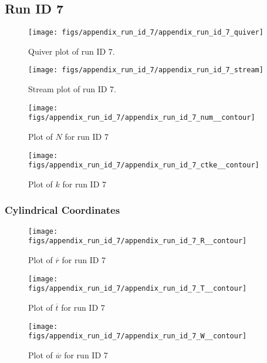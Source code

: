 \subsection{Run ID 7}
\begin{figure}[H]
\centering
\texttt{[image: figs/appendix\_run\_id\_7/appendix\_run\_id\_7\_quiver]}
\caption{Quiver plot of run ID 7.}
\label{fig:appendix_run_id_7_quiver}
\end{figure}


\begin{figure}[H]
\centering
\texttt{[image: figs/appendix\_run\_id\_7/appendix\_run\_id\_7\_stream]}
\caption{Stream plot of run ID 7.}
\label{fig:appendix_run_id_7_stream}
\end{figure}


\begin{figure}[H]
\centering
\texttt{[image: figs/appendix\_run\_id\_7/appendix\_run\_id\_7\_num\_\_contour]}
\caption{Plot of $N$ for run ID 7}
\label{fig:appendix_run_id_7_num__contour}
\end{figure}


\begin{figure}[H]
\centering
\texttt{[image: figs/appendix\_run\_id\_7/appendix\_run\_id\_7\_ctke\_\_contour]}
\caption{Plot of $k$ for run ID 7}
\label{fig:appendix_run_id_7_ctke__contour}
\end{figure}


\subsubsection{Cylindrical Coordinates}
\begin{figure}[H]
\centering
\texttt{[image: figs/appendix\_run\_id\_7/appendix\_run\_id\_7\_R\_\_contour]}
\caption{Plot of $\overline{r}$ for run ID 7}
\label{fig:appendix_run_id_7_R__contour}
\end{figure}


\begin{figure}[H]
\centering
\texttt{[image: figs/appendix\_run\_id\_7/appendix\_run\_id\_7\_T\_\_contour]}
\caption{Plot of $\overline{t}$ for run ID 7}
\label{fig:appendix_run_id_7_T__contour}
\end{figure}


\begin{figure}[H]
\centering
\texttt{[image: figs/appendix\_run\_id\_7/appendix\_run\_id\_7\_W\_\_contour]}
\caption{Plot of $\overline{w}$ for run ID 7}
\label{fig:appendix_run_id_7_W__contour}
\end{figure}


